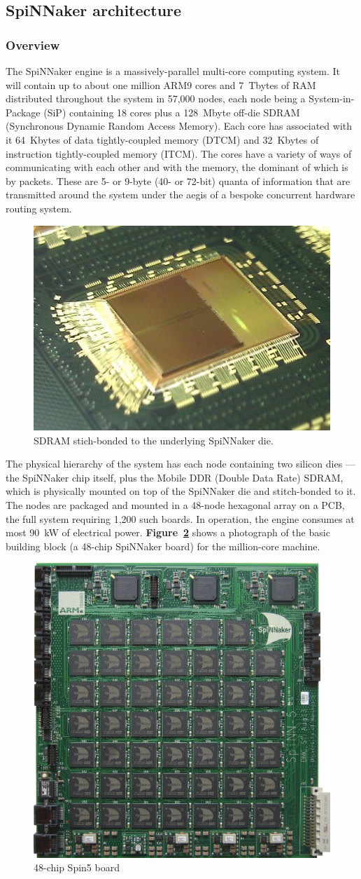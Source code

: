 \documentclass[a4paper, 11pt]{article}
\begin{document}
\subsection{SpiNNaker architecture}

\subsubsection{Overview}
The SpiNNaker engine is a massively-parallel multi-core computing system. It will contain up to about one million ARM9 cores and 7~Tbytes of RAM distributed throughout the system in 57,000 nodes, each node being a System-in-Package (SiP) containing 18 cores plus a 128~Mbyte off-die SDRAM (Synchronous Dynamic Random Access Memory). Each core has associated with it 64~Kbytes of data tightly-coupled memory (DTCM) and 32~Kbytes of instruction tightly-coupled memory (ITCM). The cores have a variety of ways of communicating with each other and with the memory, the dominant of which is by packets. These are 5- or 9-byte (40- or 72-bit) quanta of information that are transmitted around the system under the aegis of a bespoke concurrent hardware routing system. 

\begin{figure}[htbp]
	\centering
	\includegraphics[width=0.25\linewidth]{images/spinnaker_die.jpg}
	\caption{SDRAM stich-bonded to the underlying SpiNNaker die.}
	\label{fig:spin5}
\end{figure}

The physical hierarchy of the system has each node containing two silicon dies --- the SpiNNaker chip itself, plus the Mobile DDR (Double Data Rate) SDRAM, which is physically mounted on top of the SpiNNaker die and stitch-bonded to it. The nodes are packaged and mounted in a 48-node hexagonal array on a PCB, the full system requiring 1,200 such boards. In operation, the engine consumes at most 90~kW of electrical power. \textbf{Figure~\ref{fig:spin5}} shows a photograph of the basic building block (a 48-chip SpiNNaker board) for the million-core machine.

\begin{figure}[htbp]
	\centering
	\includegraphics[width=0.45\linewidth]{images/spin5.jpg}
	\caption{48-chip Spin5 board}
	\label{fig:spin5}
\end{figure}
\end{document}
